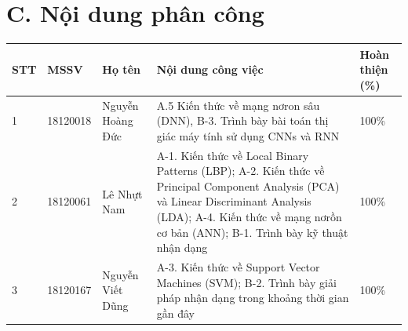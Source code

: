 \documentclass{article}
\newcommand\T{\rule{0pt}{2.6ex}}       %
\newcommand\B{\rule[-1.2ex]{0pt}{0pt}} %
\begin{document}
	\section{C. Nội dung phân công}
	\begin{center}
		\begin{tabular}{| l | l | l | p{5.5cm} | p{3cm} |}
			\hline
			STT & MSSV & Họ tên & Nội dung công việc & Hoàn thiện (\%)\T\B\\ \hline
			1 & 18120018 & Nguyễn Hoàng Đức & A.5 Kiến thức về mạng nơron sâu (DNN), B-3. Trình bày bài toán thị giác máy tính sử dụng CNNs và RNN & 100\%\T\B \\ \hline
			2 & 18120061 & Lê Nhựt Nam & A-1. Kiến thức về Local Binary Patterns (LBP); A-2. Kiến thức về Principal Component Analysis (PCA) và Linear Discriminant Analysis (LDA); A-4. Kiến thức về mạng nơrồn cơ bản (ANN); B-1. Trình bày  kỹ thuật nhận dạng & 100\%\T\B \\ \hline
			3 & 18120167 & Nguyễn Viết Dũng &  A-3. Kiến thức về Support Vector Machines (SVM); B-2. Trình bày giải pháp nhận dạng trong khoảng thời gian gần đây & 100\%\T\B \\ \hline
		\end{tabular}
	\end{center}
	
	\nocite{*}
	\newpage\cleardoublepage
	
\end{document}
